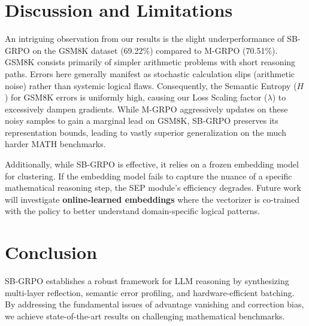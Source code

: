 \documentclass[runningheads]{llncs}
\begin{document}
\section{Discussion and Limitations}
An intriguing observation from our results is the slight underperformance of SB-GRPO on the GSM8K dataset (69.22\%) compared to M-GRPO (70.51\%). GSM8K consists primarily of simpler arithmetic problems with short reasoning paths. Errors here generally manifest as stochastic calculation slips (arithmetic noise) rather than systemic logical flaws. Consequently, the Semantic Entropy ($H$) for GSM8K errors is uniformly high, causing our Loss Scaling factor ($\lambda$) to excessively dampen gradients. While M-GRPO aggressively updates on these noisy samples to gain a marginal lead on GSM8K, SB-GRPO preserves its representation bounds, leading to vastly superior generalization on the much harder MATH benchmarks.

Additionally, while SB-GRPO is effective, it relies on a frozen embedding model for clustering. If the embedding model fails to capture the nuance of a specific mathematical reasoning step, the SEP module's efficiency degrades. Future work will investigate \textbf{online-learned embeddings} where the vectorizer is co-trained with the policy to better understand domain-specific logical patterns.

\section{Conclusion}
SB-GRPO establishes a robust framework for LLM reasoning by synthesizing multi-layer reflection, semantic error profiling, and hardware-efficient batching. By addressing the fundamental issues of advantage vanishing and correction bias, we achieve state-of-the-art results on challenging mathematical benchmarks.




\end{document}
